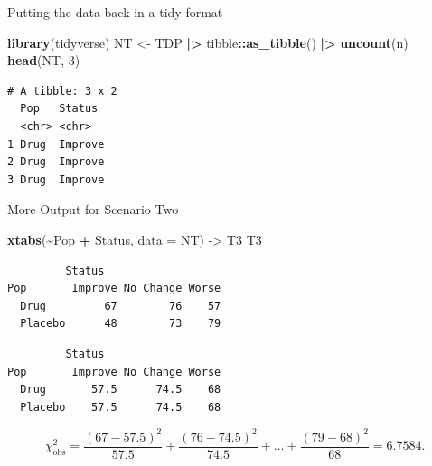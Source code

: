 \documentclass[
  ignorenonframetext,
]{beamer}
\newenvironment{Shaded}{\begin{snugshade}}{\end{snugshade}}
\newcommand{\AttributeTok}[1]{\textcolor[rgb]{0.13,0.29,0.53}{#1}}
\newcommand{\DecValTok}[1]{\textcolor[rgb]{0.00,0.00,0.81}{#1}}
\newcommand{\FunctionTok}[1]{\textcolor[rgb]{0.13,0.29,0.53}{\textbf{#1}}}
\newcommand{\NormalTok}[1]{#1}
\newcommand{\OtherTok}[1]{\textcolor[rgb]{0.56,0.35,0.01}{#1}}
\newcommand{\SpecialCharTok}[1]{\textcolor[rgb]{0.81,0.36,0.00}{\textbf{#1}}}
\begin{document}
\begin{frame}[fragile]{Putting the data back in a tidy format}
\label{putting-the-data-back-in-a-tidy-format}
\begin{Shaded}
\begin{Highlighting}[]
\FunctionTok{library}\NormalTok{(tidyverse)}
\NormalTok{NT }\OtherTok{\textless{}{-}}\NormalTok{ TDP }\SpecialCharTok{|\textgreater{}} 
\NormalTok{  tibble}\SpecialCharTok{::}\FunctionTok{as\_tibble}\NormalTok{() }\SpecialCharTok{|\textgreater{}} 
  \FunctionTok{uncount}\NormalTok{(n)}
\FunctionTok{head}\NormalTok{(NT, }\DecValTok{3}\NormalTok{)}
\end{Highlighting}
\end{Shaded}

\begin{verbatim}
# A tibble: 3 x 2
  Pop   Status 
  <chr> <chr>  
1 Drug  Improve
2 Drug  Improve
3 Drug  Improve
\end{verbatim}
\end{frame}

\begin{frame}[fragile]{More Output for Scenario Two}
\label{more-output-for-scenario-two}
\begin{Shaded}
\begin{Highlighting}[]
\FunctionTok{xtabs}\NormalTok{(}\SpecialCharTok{\textasciitilde{}}\NormalTok{Pop }\SpecialCharTok{+}\NormalTok{ Status, }\AttributeTok{data =}\NormalTok{ NT) }\OtherTok{{-}\textgreater{}}\NormalTok{ T3}
\NormalTok{T3}
\end{Highlighting}
\end{Shaded}

\begin{verbatim}
         Status
Pop       Improve No Change Worse
  Drug         67        76    57
  Placebo      48        73    79
\end{verbatim}

\begin{Shaded}
\end{Shaded}

\begin{verbatim}
         Status
Pop       Improve No Change Worse
  Drug       57.5      74.5    68
  Placebo    57.5      74.5    68
\end{verbatim}

\[\chi^2_{\text{obs}}=\frac{(67 - 57.5)^2}{57.5} + \frac{(76 - 74.5)^2}{74.5}+
\dots +\frac{(79-68)^2}{68}=6.7584.\]
\end{frame}
\end{document}

